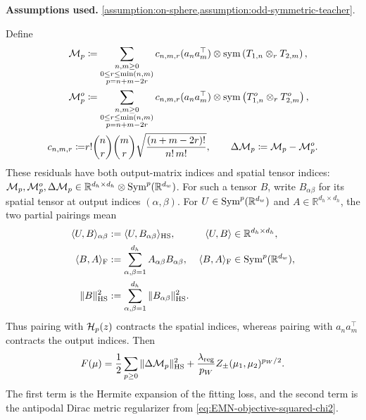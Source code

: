 \begin{lemma}
\label{lemma:EMN-expansion-F}
\textbf{Assumptions used.} \cref{assumption:on-sphere,assumption:odd-symmetric-teacher}.

Define
\begin{align}
    \mathcal M_p
    &\coloneq
    \sum_{\substack{n,m\ge 0\\ 0\le r\le \min(n,m)\\ p=n+m-2r}}
    c_{n,m,r}(a_n a_m^\top)\otimes \mathrm{sym}\left({T_{1,n}\otimes_{r} T_{2,m}}\right),
    \\
    \mathcal M_p^o
    &\coloneq
    \sum_{\substack{n,m\ge 0\\ 0\le r\le \min(n,m)\\ p=n+m-2r}}
    c_{n,m,r}(a_n a_m^\top)\otimes \mathrm{sym}\left({T_{1,n}^o\otimes_{r} T_{2,m}^o}\right),
    \\
    c_{n,m,r}
    \coloneq&
    r!\binom nr\binom mr
    \sqrt{\frac{(n+m-2r)!}{n!\,m!}},
    \qquad
    \Delta\mathcal M_p\coloneq \mathcal M_p-\mathcal M_p^o.
\end{align}
These residuals have both output-matrix indices and spatial tensor indices:
$\mathcal M_p,\mathcal M_p^o,\Delta\mathcal M_p
\in\mathbb R^{d_h\times d_h}\otimes\mathrm{Sym}^p(\mathbb R^{d_w})$.
For such a tensor $B$, write $B_{\alpha\beta}$ for its spatial tensor
at output indices $(\alpha,\beta)$. For $U\in\mathrm{Sym}^p(\mathbb R^{d_w})$
and $A\in\mathbb R^{d_h\times d_h}$, the two partial pairings mean
\begin{equation}
\label{eq:mf-matrix-tensor-partial-pairings}
\begin{aligned}
 \langle U,B\rangle_{\alpha\beta}
 &:=\langle U,B_{\alpha\beta}\rangle_{\rm HS},
 &\langle U,B\rangle&\in\mathbb R^{d_h\times d_h},\\
 \langle B,A\rangle_{\rm F}
 &:=\sum_{\alpha,\beta=1}^{d_h}A_{\alpha\beta}B_{\alpha\beta},
 &\langle B,A\rangle_{\rm F}&\in\mathrm{Sym}^p(\mathbb R^{d_w}),\\
 \|B\|_{\rm HS}^2
 &:=\sum_{\alpha,\beta=1}^{d_h}\|B_{\alpha\beta}\|_{\rm HS}^2.
\end{aligned}
\end{equation}
Thus pairing with $\mathcal{H}_p(z)$ contracts the spatial indices,
whereas pairing with $a_na_m^\top$ contracts the output indices.
Then
\begin{equation}
\label{eq:EMN-expanded-squared-chi2-objective}
    F(\mu)
    =
    \frac12\sum_{p\ge 0}\|\Delta\mathcal M_p\|_{\mathrm{HS}}^2
    +
    \frac{\lambda_{\mathrm{reg}}}{p_W}Z_\pm(\mu_1,\mu_2)^{p_W/2}.
\end{equation}
The first term is the Hermite expansion of the fitting loss, and the second term is the antipodal Dirac metric regularizer from \eqref{eq:EMN-objective-squared-chi2}.
\end{lemma}

